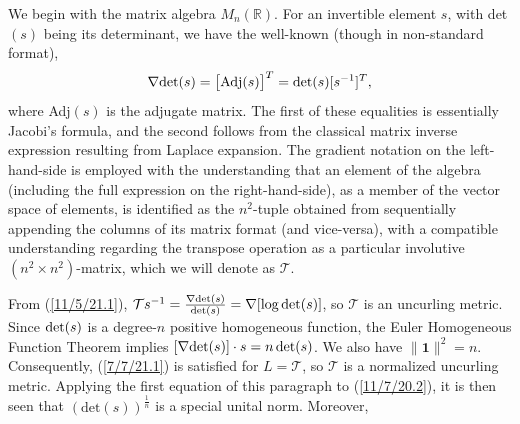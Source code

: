 \documentclass{amsart}
\numberwithin{equation}{section}
\theoremstyle{definition}
\numberwithin{theorem}{section}
\begin{document}
 We begin with the matrix algebra $ M_n(\mathbb{R})$. For an invertible element $s$, with det$(s)$ being its determinant, we have the well-known (though in non-standard format),
  \begin{equation}\label{11/5/21.1} \nabla \mbox{det}(s) = \big[{\rm Adj}(s)\big]^T = \mbox{det}(s)[s^{-1}]^T,\end{equation} where Adj$(s)$ is the adjugate matrix.  The first of these equalities is essentially Jacobi's formula, and the second follows from the classical matrix inverse expression resulting from Laplace expansion.  The gradient notation on the left-hand-side is employed with the understanding that an element of the algebra (including the full expression on the right-hand-side), as a member of the vector space of elements, is identified as the $n^2$-tuple obtained from sequentially appending the columns of its matrix format (and vice-versa), with a compatible understanding regarding the transpose operation as a particular involutive $(n^2\times n^2)$-matrix, which we will denote as $\mathcal{T}$. 
  
From (\ref{11/5/21.1}), $\mathcal{T}s^{-1} = \frac{\nabla{\rm det}(s)}{{\rm det}(s)} = \nabla[\log{\rm det}(s)]$, so $\mathcal{T}$ is an uncurling metric.  Since ${\rm det}(s)$ is a degree-$n$ positive homogeneous function, the Euler Homogeneous Function Theorem implies $[\nabla{\rm det}(s)]\cdot s = n \,{\rm det}(s)$.  We also have $\|\mathbf{1}\|^2 = n$.  Consequently, (\ref{7/7/21.1}) is satisfied for $L=\mathcal{T}$, so $\mathcal{T}$ is a normalized uncurling metric.  Applying the first equation of this paragraph to (\ref{11/7/20.2}), it is then seen that $(\text{det}(s))^{\frac{1}{n}}$ is a special unital norm.
  Moreover,
 
\end{document}
